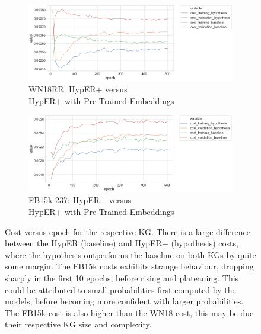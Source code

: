 \begin{figure}[H]
	\begin{subfigure}[b]{.5\linewidth}
   		\centering
    		\includegraphics[width=1.0\linewidth, height=0.6\linewidth]{WN18RR_Cost_Results_ptwv}
		\captionsetup{justification=centering}
		\caption{WN18RR: HypER+ versus \\ HypER+ with Pre-Trained Embeddings}
	\end{subfigure}
	\begin{subfigure}[b]{.5\linewidth}
   		\centering
		\includegraphics[width=1.0\linewidth, height=0.6\linewidth]{FB15k-237_Cost_Results_ptwv}
		\captionsetup{justification=centering}
		\caption{FB15k-237: HypER+ versus \\ HypER+ with Pre-Trained Embeddings}
	\end{subfigure}
	\captionsetup{justification=centering}
	\caption{Cost versus epoch for the respective KG. There is a large difference between the HypER (baseline) and HypER+ (hypothesis) costs, where the hypothesis outperforms the baseline on both KGs by quite some margin. The FB15k costs exhibits strange behaviour, dropping sharply in the first 10 epochs, before rising and plateauing. This could be attributed to small probabilities first computed by the models, before becoming more confident with larger probabilities. The FB15k cost is also higher than the WN18 cost, this may be due their respective KG size and complexity.}
\end{figure}


